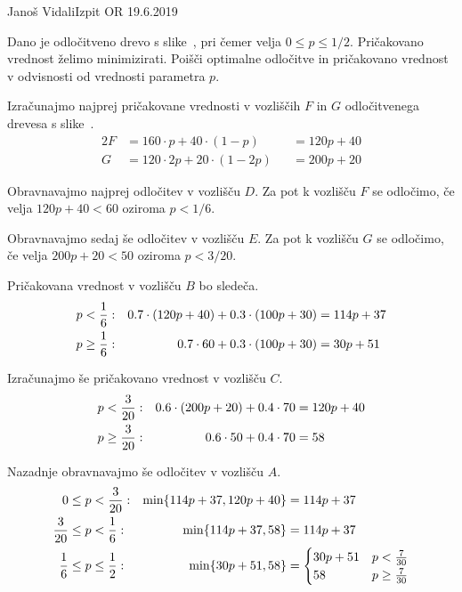 \begin{naloga}{Janoš Vidali}{Izpit OR 19.6.2019}
\begin{vprasanje}
Dano je odločitveno drevo s slike~\fig,
pri čemer velja $0 \le p \le 1/2$.
Pričakovano vred\-nost želimo minimizirati.
Poišči optimalne odločitve in pričakovano vrednost
v odvisnosti od vrednosti parametra $p$.

\begin{slika}
\pgfslika
{}
\end{slika}
\end{vprasanje}

\begin{odgovor}
Izračunajmo najprej pričakovane vrednosti v vozliščih $F$ in $G$
odločitvenega drevesa s slike~\fig.
\begin{alignat*}{2}
F &= 160 \cdot p + 40 \cdot (1-p) &&= 120 p + 40 \\
G &= 120 \cdot 2p + 20 \cdot (1-2p) &&= 200 p + 20
\end{alignat*}

Obravnavajmo najprej odločitev v vozlišču $D$.
Za pot k vozlišču $F$ se odločimo,
če velja $120p + 40 < 60$ oziroma $p < 1/6$.

Obravnavajmo sedaj še odločitev v vozlišču $E$.
Za pot k vozlišču $G$ se odločimo,
če velja $200p + 20 < 50$ oziroma $p < 3/20$.

Pričakovana vrednost v vozlišču $B$ bo sledeča.
\begin{align*}
p &< {1 \over 6}: & 0.7 \cdot (120p + 40) + 0.3 \cdot (100p + 30) &= 114p + 37
\\
p &\ge {1 \over 6}: & 0.7 \cdot 60 + 0.3 \cdot (100p + 30) &= 30p + 51
\end{align*}

Izračunajmo še pričakovano vrednost v vozlišču $C$.
\begin{align*}
p &< {3 \over 20}: & 0.6 \cdot (200p + 20) + 0.4 \cdot 70 &= 120p + 40
\\
p &\ge {3 \over 20}: & 0.6 \cdot 50 + 0.4 \cdot 70 &= 58
\end{align*}

Nazadnje obravnavajmo še odločitev v vozlišču $A$.
\begin{align*}
0 \le p &< {3 \over 20}: & \min \{ 114p + 37, 120p + 40 \} &= 114p + 37 \\
{3 \over 20} \le p &< {1 \over 6} : & \min \{ 114p + 37, 58 \} &= 114p + 37 \\
{1 \over 6} \le p &\le {1 \over 2} : & \min \{ 30p + 51, 58 \} &= \begin{cases}
30p + 51 & p < {7 \over 30} \\
58 & p \ge {7 \over 30}
\end{cases}
\end{align*}


\end{odgovor}
\end{naloga}
